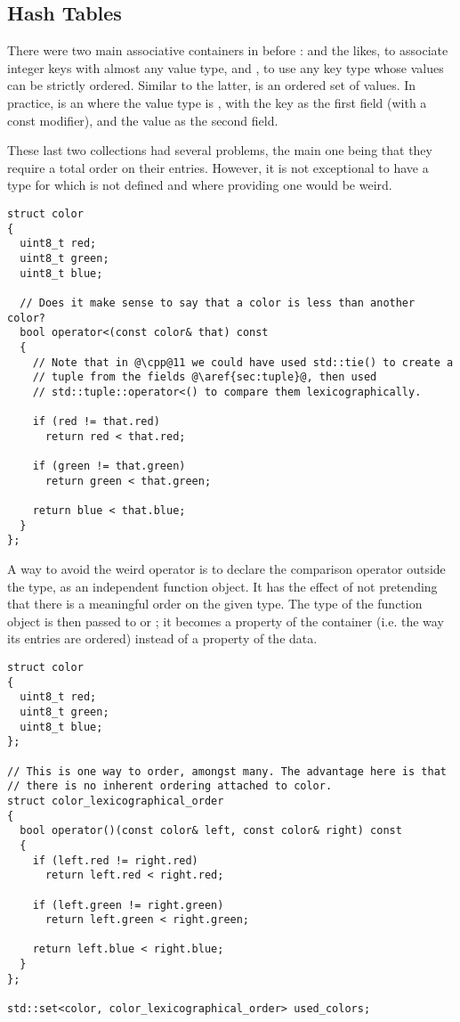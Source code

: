 \subsection{Hash Tables}

There were two main associative containers in \cpp{} before :
 and the likes, to associate integer keys with
almost any value type, and , to use any key type whose
values can be strictly ordered. Similar to the latter, 
is an ordered set of values. In practice,  is an
 where the value type is , with the key
as the first field (with a const modifier), and the value as the
second field.

These last two collections had several problems, the main one being
that they require a total order on their entries. However, it is not
exceptional to have a type for which  is not defined
and where providing one would be weird.

\begin{lstlisting}
struct color
{
  uint8_t red;
  uint8_t green;
  uint8_t blue;

  // Does it make sense to say that a color is less than another color?
  bool operator<(const color& that) const
  {
    // Note that in @\cpp@11 we could have used std::tie() to create a
    // tuple from the fields @\aref{sec:tuple}@, then used
    // std::tuple::operator<() to compare them lexicographically.

    if (red != that.red)
      return red < that.red;

    if (green != that.green)
      return green < that.green;

    return blue < that.blue;
  }
};
\end{lstlisting}

A way to avoid the weird operator is to declare the comparison
operator outside the type, as an independent function object. It has
the effect of not pretending that there is a meaningful order on the
given type. The type of the function object is then passed to
 or ; it becomes a property of the
container (i.e. the way its entries are ordered) instead of a property
of the data.

\begin{lstlisting}
struct color
{
  uint8_t red;
  uint8_t green;
  uint8_t blue;
};

// This is one way to order, amongst many. The advantage here is that
// there is no inherent ordering attached to color.
struct color_lexicographical_order
{
  bool operator()(const color& left, const color& right) const
  {
    if (left.red != right.red)
      return left.red < right.red;

    if (left.green != right.green)
      return left.green < right.green;

    return left.blue < right.blue;
  }
};

std::set<color, color_lexicographical_order> used_colors;
\end{lstlisting}

